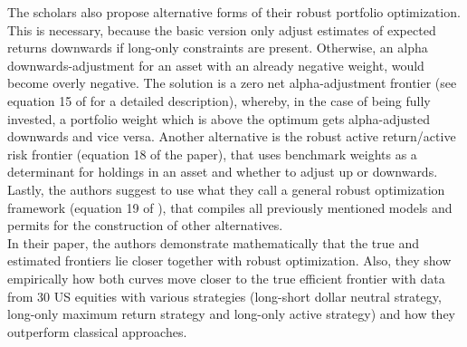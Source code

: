 The scholars also propose alternative forms of their robust portfolio optimization.
This is necessary, because the basic version only adjust estimates of expected returns downwards if long-only constraints are present. Otherwise, an alpha downwards-adjustment for an asset with an already negative weight, would become overly negative.
The solution is a zero net alpha-adjustment frontier (see equation 15 of \cite{ceria_stubbs_2006} for a detailed description), whereby, in the case of being fully invested, a portfolio weight which is above the optimum gets alpha-adjusted downwards and vice versa.
Another alternative is the robust active return/active risk frontier (equation 18 of the \citeauthor{ceria_stubbs_2006} paper), that uses benchmark weights as a determinant for holdings in an asset and whether to adjust up or downwards.
Lastly, the authors suggest to use what they call a general robust optimization framework (equation 19 of \cite{ceria_stubbs_2006}), that compiles all previously mentioned models and permits for the construction of other alternatives.\\
In their paper, the authors demonstrate mathematically that the true and 
estimated frontiers lie closer together with robust optimization. Also, they show empirically how both curves move closer to the true efficient frontier with data from 30 US equities with various strategies (long-short dollar neutral strategy, long-only maximum return strategy and long-only active strategy) and how they outperform classical approaches.\\